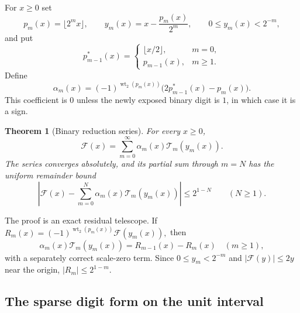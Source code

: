 \documentclass[11pt,oneside]{article}
\newtheorem{theorem}{Theorem}[section]
\theoremstyle{definition}
\theoremstyle{remark}
\newcommand{\wt}{\operatorname{wt}_2}
\begin{document}
For $x\ge0$ set
\begin{equation}
 p_m(x)=\lfloor2^mx\rfloor,
 \qquad
 y_m(x)=x-\frac{p_m(x)}{2^m},
 \qquad 0\le y_m(x)<2^{-m},                               \label{dyadicweb:eq:prefix-tail-local}
\end{equation}
and put
\begin{equation}
 p^*_{m-1}(x)=
 \begin{cases}
 \lfloor x/2\rfloor,&m=0,\\
 p_{m-1}(x),&m\ge1.
 \end{cases}                                               \label{dyadicweb:eq:previous-prefix-local}
\end{equation}
Define
\begin{equation}
 \alpha_m(x)=(-1)^{\wt(p_m(x))}
 \bigl(2p^*_{m-1}(x)-p_m(x)\bigr).                         \label{dyadicweb:eq:alpha-local}
\end{equation}
This coefficient is $0$ unless the newly exposed binary digit is $1$, in which case it is a
sign.

\begin{theorem}[Binary reduction series]
\label{dyadicweb:thm:binary-series-local}
For every $x\ge0$,
\begin{equation}
 \boxed{
 \mathcal F(x)=\sum_{m=0}^{\infty}
 \alpha_m(x)\mathcal T_m(y_m(x)).}                        \label{dyadicweb:eq:binary-series-local}
\end{equation}
The series converges absolutely, and its partial sum through $m=N$ has the uniform remainder
bound
\begin{equation}
 \left|\mathcal F(x)-\sum_{m=0}^{N}
 \alpha_m(x)\mathcal T_m(y_m(x))\right|\le2^{1-N}
 \qquad(N\ge1).                                           \label{dyadicweb:eq:binary-tail-local}
\end{equation}
\end{theorem}

The proof is an exact residual telescope.  If
\(
 R_m(x)=(-1)^{\wt(p_m(x))}\mathcal F(y_m(x)),
\)
then
\[
 \alpha_m(x)\mathcal T_m(y_m(x))=R_{m-1}(x)-R_m(x)
 \quad(m\ge1),
\]
with a separately correct scale-zero term.  Since $0\le y_m<2^{-m}$ and
$|\mathcal F(y)|\le2y$ near the origin, $|R_m|\le2^{1-m}$.

\subsection{The sparse digit form on the unit interval}
\end{document}

